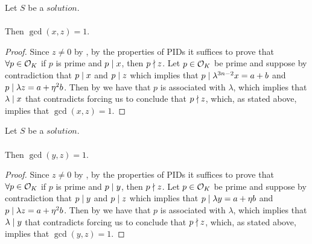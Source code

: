 \begin{lemma}
    \label{lmm:coprime_x_z}
    \leanok
    Let $S$ be a $solution$.\\\\
    Then $\gcd(x,z) = 1$.
\end{lemma}
\begin{proof}
    \leanok
    Since $z \neq 0$ by , by the properties of PIDs it suffices to prove that
    $\forall p \in \mathcal{O}_K$ if $p$ is prime and $p \mid x$, then $p \nmid z$.
    Let $p \in \mathcal{O}_K$ be prime and suppose by contradiction that $p \mid x$ and $p \mid z$
    which implies that $p \mid \lambda^{3n-2} x = a+b$ and $p \mid \lambda z = a + \eta^2 b$.
    Then by 
    we have that $p$ is associated with $\lambda$, which implies that $\lambda \mid x$
    that contradicts  forcing us to conclude that $p \nmid z$, which,
    as stated above, implies that $\gcd(x,z)=1$.
\end{proof}

\begin{lemma}
    \label{lmm:coprime_y_z}
    \leanok
    Let $S$ be a $solution$.\\\\
    Then $\gcd(y, z) = 1$.
\end{lemma}
\begin{proof}
    \leanok
    Since $z \neq 0$ by , by the properties of PIDs it suffices to prove that
    $\forall p \in \mathcal{O}_K$ if $p$ is prime and $p \mid y$, then $p \nmid z$.
    Let $p \in \mathcal{O}_K$ be prime and suppose by contradiction that $p \mid y$ and $p \mid z$
    which implies that $p \mid \lambda y = a+\eta b$ and $p \mid \lambda z = a + \eta^2 b$.
    Then by 
    we have that $p$ is associated with $\lambda$, which implies that $\lambda \mid y$
    that contradicts  forcing us to conclude that $p \nmid z$, which,
    as stated above, implies that $\gcd(y,z)=1$.
\end{proof}

